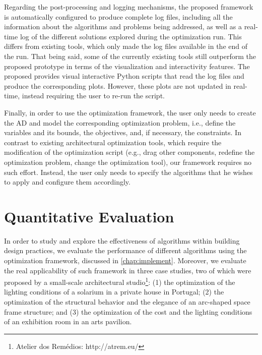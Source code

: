 Regarding the post-processing and logging mechanisms, the proposed framework is automatically configured to produce complete log files, including all the information about the algorithms and problems being addressed, as well as a real-time log of the different solutions explored during the optimization run. This differs from existing tools, which only made the log files available in the end of the run. That being said, some of the currently existing tools still outperform the proposed prototype in terms of the visualization and interactivity features. The proposed provides visual interactive Python scripts that read the log files and produce the corresponding plots. However, these plots are not updated in real-time, instead requiring the user to re-run the script.

Finally, in order to use the optimization framework, the user only needs to create the \ac{AD} and model the corresponding optimization problem, i.e., define the variables and its bounds, the objectives, and, if necessary, the constraints. In contrast to existing architectural optimization tools, which require the modification of the optimization script (e.g., drag other components, redefine the optimization problem, change the optimization tool), our framework requires no such effort. Instead, the user only needs to specify the algorithms that he wishes to apply and configure them accordingly.

\section{Quantitative Evaluation}
\label{sec:quantitative}

In order to study and explore the effectiveness of algorithms within building design practices, we evaluate the performance of different algorithms using the optimization framework, discussed in \cref{chap:implement}. Moreover, we evaluate the real applicability of such framework in three case studies, two of which were proposed by a small-scale architectural studio\footnote{Atelier dos Remédios: http://atrem.eu/}: (1) the optimization of the lighting conditions of a solarium in a private house in Portugal; (2) the optimization of the structural behavior and the elegance of an arc-shaped space frame structure; and (3) the optimization of the cost and the lighting conditions of an exhibition room in an arts pavilion.   

